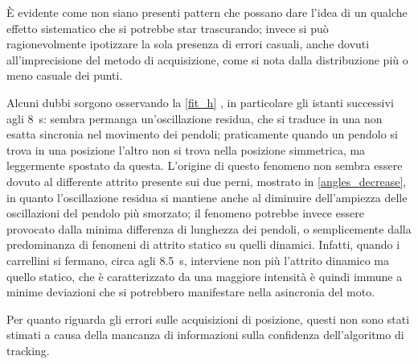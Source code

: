 \documentclass[11pt, a4paper, twoside, italian]{article}
\begin{document}
È evidente come non siano presenti pattern che possano dare l'idea di un qualche effetto
sistematico che si potrebbe star trascurando; invece si può ragionevolmente ipotizzare la sola 
presenza di errori casuali, anche dovuti all'imprecisione del metodo di acquisizione, come si nota
dalla distribuzione più o meno casuale dei punti.

Alcuni dubbi sorgono osservando la \cref{fit_h}
, in particolare gli istanti successivi agli \SI{8}{\s}: sembra permanga un'oscillazione
residua, che si traduce in una non esatta sincronia nel movimento dei pendoli; 
praticamente quando un pendolo si trova in una posizione l'altro non si trova nella 
posizione simmetrica, ma leggermente spostato da questa.
L'origine di questo fenomeno non sembra essere dovuto al differente
attrito presente sui due perni, mostrato in \cref{angles_decrease}, in quanto
l'oscillazione residua si mantiene anche al diminuire dell'ampiezza delle
oscillazioni del pendolo più smorzato; il fenomeno potrebbe invece essere 
provocato dalla minima differenza di lunghezza 
dei pendoli, o semplicemente dalla predominanza di fenomeni di attrito statico 
su quelli dinamici.
Infatti, quando i carrellini si fermano, circa agli \SI{8.5}{\s}, interviene non
più l'attrito dinamico ma quello statico, che è caratterizzato da una maggiore intensità
è quindi immune a minime deviazioni che si potrebbero manifestare nella asincronia del moto.

Per quanto riguarda gli errori sulle acquisizioni di posizione, questi non sono stati
stimati a causa della mancanza di informazioni sulla confidenza dell'algoritmo di tracking.
\end{document}
